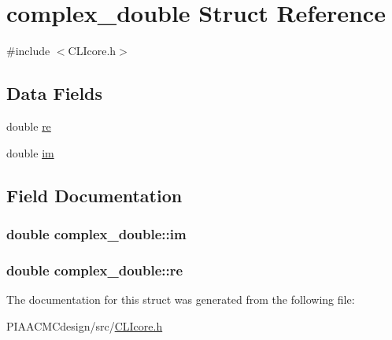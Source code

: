 \hypertarget{structcomplex__double}{\section{complex\+\_\+double Struct Reference}
\label{structcomplex__double}
}


{\ttfamily \#include $<$C\+L\+Icore.\+h$>$}

\subsection*{Data Fields}
\begin{DoxyCompactItemize}
\item 
double \hyperlink{structcomplex__double_af3466e0949b17c561569ba827aa878f4}{re}
\item 
double \hyperlink{structcomplex__double_a24c8308c824e9b7256bd1beccb571520}{im}
\end{DoxyCompactItemize}


\subsection{Field Documentation}
\hypertarget{structcomplex__double_a24c8308c824e9b7256bd1beccb571520}{
\subsubsection[{im}]{\setlength{\rightskip}{0pt plus 5cm}double complex\+\_\+double\+::im}}\label{structcomplex__double_a24c8308c824e9b7256bd1beccb571520}
\hypertarget{structcomplex__double_af3466e0949b17c561569ba827aa878f4}{
\subsubsection[{re}]{\setlength{\rightskip}{0pt plus 5cm}double complex\+\_\+double\+::re}}\label{structcomplex__double_af3466e0949b17c561569ba827aa878f4}


The documentation for this struct was generated from the following file\+:\begin{DoxyCompactItemize}
\item 
P\+I\+A\+A\+C\+M\+Cdesign/src/\hyperlink{PIAACMCdesign_2src_2CLIcore_8h}{C\+L\+Icore.\+h}\end{DoxyCompactItemize}
